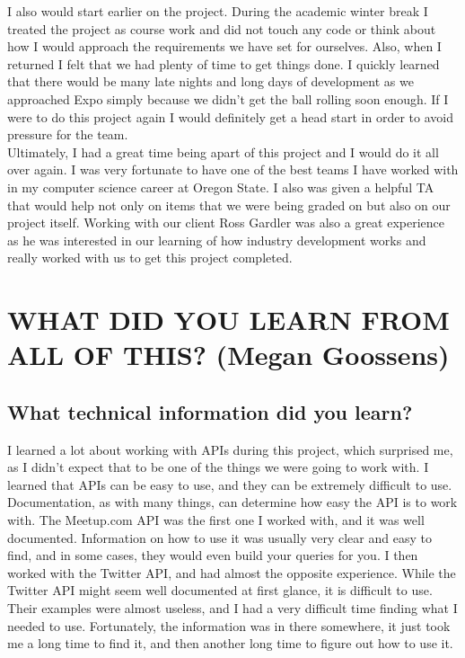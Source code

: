 \documentclass[draftclsnofoot,10pt,onecolumn]{IEEEtran} %
\begin{document}
I also would start earlier on the project. During the academic winter break I
treated the project as course work and did not touch any code or think about how
I would approach the requirements we have set for ourselves. Also, when I
returned I felt that we had plenty of time to get things done. I quickly learned
that there would be many late nights and long days of development as we
approached Expo simply because we didn't get the ball rolling soon enough. If I
were to do this project again I would definitely get a head start in order to
avoid pressure for the team. \\

Ultimately, I had a great time being apart of this project and I would do it all
over again. I was very fortunate to have one of the best teams I have worked
with in my computer science career at Oregon State. I also was given a helpful
TA that would help not only on items that we were being graded on but also on
our project itself. Working with our client Ross Gardler was also a great
experience as he was interested in our learning of how industry development
works and really worked with us to get this project completed.

\section{WHAT DID YOU LEARN FROM ALL OF THIS? (Megan Goossens)}
\subsection{What technical information did you learn?}
I learned a lot about working with APIs during this project, which surprised me,
as I didn't expect that to be one of the things we were going to work with. I
learned that APIs can be easy to use, and they can be extremely difficult to
use. Documentation, as with many things, can determine how easy the API is to
work with. The Meetup.com API was the first one I worked with, and it was well
documented. Information on how to use it was usually very clear and easy to
find, and in some cases, they would even build your queries for you. I then
worked with the Twitter API, and had almost the opposite experience. While the
Twitter API might seem well documented at first glance, it is difficult to use.
Their examples were almost useless, and I had a very difficult time finding what
I needed to use. Fortunately, the information was in there somewhere, it just
took me a long time to find it, and then another long time to figure out how to
use it.
\end{document}
